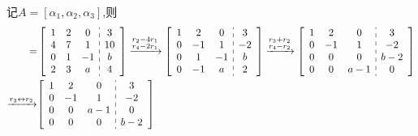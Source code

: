 \documentclass{article}
\begin{document}
\begin{jie}
记$A=[\alpha_{1},\alpha_{2},\alpha_{3}]$,则
\begin{align*}
[A|\beta]=&
\left[
\begin{array}{c:c}
\begin{matrix}
1 & 2 & 0 \\
  4 & 7 & 1 \\
  0 & 1 & -1\\
  2& 3&a
\end{matrix}&
\begin{matrix}
3  \\
10\\
b\\
4
\end{matrix}
\end{array}
\right]
\xrightarrow{\substack{r_{2}-4r_{1}\\ r_{4}-2r_{1}}}
{
\left[
\begin{array}{c:c}
\begin{matrix}
1 & 2 & 0 \\
  0 & -1 & 1 \\
  0 & 1 & -1\\
  0& -1&a
\end{matrix}&
\begin{matrix}
3  \\
-2\\
b\\
2
\end{matrix}
\end{array}
\right]
}
\xrightarrow{\substack{r_{3}+r_{2}\\ r_{4}-r_{2}}}
{
\left[
\begin{array}{c:c}
\begin{matrix}
1 & 2 & 0 \\
  0 & -1 & 1 \\
  0 & 0 & 0\\
  0& 0&a-1
\end{matrix}&
\begin{matrix}
3  \\
-2\\
b-2\\
0
\end{matrix}
\end{array}
\right]
}\\
\xrightarrow{r_{3}\leftrightarrow r_{2}}&
{
\left[
\begin{array}{c:c}
\begin{matrix}
1 & 2 & 0 \\
  0 & -1 & 1 \\
   0& 0&a-1\\
 0 & 0 & 0
\end{matrix}&
\begin{matrix}
3  \\
-2\\
0\\
b-2
\end{matrix}
\end{array}
\right]
}
\end{align*}


\end{jie}
\end{document}
